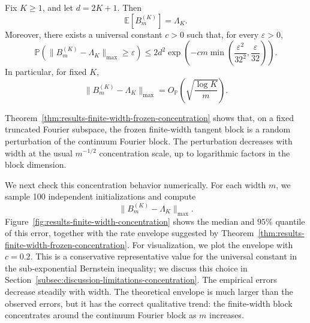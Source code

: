 \begin{theorem}
	\label{thm:results-finite-width-frozen-concentration}
	Fix \(K\ge 1\), and let \(d=2K+1\). Then
	\begin{equation}
		\mathbb E[B_m^{(K)}]=\Lambda_K.
		\label{eq:results-finite-width-mean}
	\end{equation}
	Moreover, there exists a universal constant \(c>0\) such that, for every
	\(\varepsilon>0\),
	\begin{equation}
		\mathbb P\!\left(
		\|B_m^{(K)}-\Lambda_K\|_{\max}\ge \varepsilon
		\right)
		\le
		2d^2
		\exp\!\left(
		-cm\min\!\left(\frac{\varepsilon^2}{32^2},\frac{\varepsilon}{32}\right)
		\right).
		\label{eq:results-finite-width-max-bound}
	\end{equation}
	In particular, for fixed \(K\),
	\begin{equation}
		\|B_m^{(K)}-\Lambda_K\|_{\max}
		=
		O_{\mathbb P}\!\left(\sqrt{\frac{\log K}{m}}\right).
		\label{eq:results-finite-width-rate}
	\end{equation}
\end{theorem}


Theorem~\ref{thm:results-finite-width-frozen-concentration} shows that, on a
fixed truncated Fourier subspace, the frozen finite-width tangent block is a
random perturbation of the continuum Fourier block. The perturbation decreases
with width at the usual \(m^{-1/2}\) concentration scale, up to logarithmic
factors in the block dimension.

We next check this concentration behavior numerically. For each width \(m\), we
sample 100 independent initializations and compute
\[
	\|B_m^{(K)}-\Lambda_K\|_{\max}.
\]
Figure~\ref{fig:results-finite-width-concentration} shows the median and
\(95\%\) quantile of this error, together with the rate envelope suggested by
Theorem~\ref{thm:results-finite-width-frozen-concentration}. For visualization,
we plot the envelope with \(c=0.2\). This is a conservative representative value
for the universal constant in the sub-exponential Bernstein inequality; we
discuss this choice in Section~\ref{subsec:discussion-limitations-concentration}.
The empirical errors decrease steadily with width. The theoretical envelope is
much larger than the observed errors, but it has the correct qualitative trend:
the finite-width block concentrates around the continuum Fourier block as \(m\)
increases.

